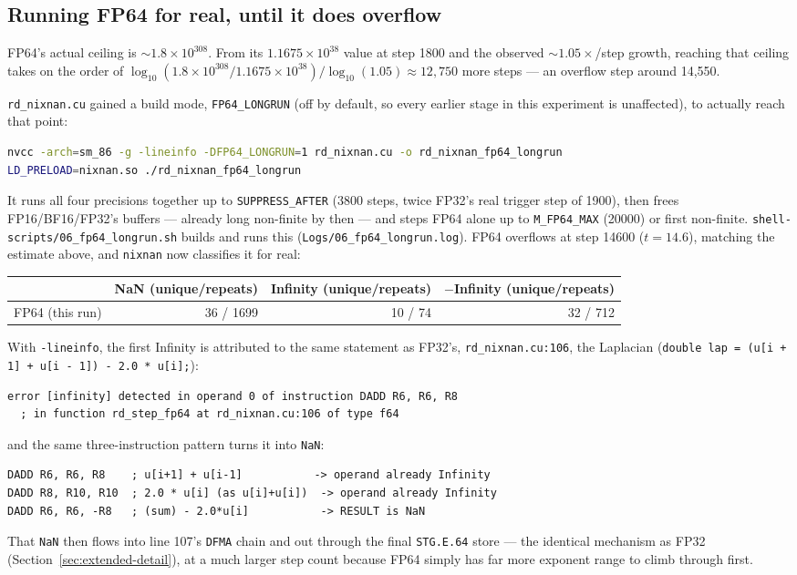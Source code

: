 \documentclass[11pt]{article}
\begin{document}
\subsection{Running FP64 for real, until it does overflow}
\label{sec:fp64-real}

FP64's actual ceiling is $\sim\!1.8\times10^{308}$. From its $1.1675\times10^{38}$ value
at step 1800 and the observed ${\sim}1.05\times$/step growth, reaching that ceiling takes
on the order of $\log_{10}(1.8\times10^{308}/1.1675\times10^{38}) / \log_{10}(1.05)
\approx 12{,}750$ more steps --- an overflow step around 14{,}550.

\texttt{rd\_nixnan.cu} gained a build mode, \texttt{FP64\_LONGRUN} (off by default, so
every earlier stage in this experiment is unaffected), to actually reach that point:
\begin{lstlisting}[language=bash]
nvcc -arch=sm_86 -g -lineinfo -DFP64_LONGRUN=1 rd_nixnan.cu -o rd_nixnan_fp64_longrun
LD_PRELOAD=nixnan.so ./rd_nixnan_fp64_longrun
\end{lstlisting}
It runs all four precisions together up to \texttt{SUPPRESS\_AFTER} (3800 steps, twice
FP32's real trigger step of 1900), then frees FP16/BF16/FP32's buffers --- already long
non-finite by then --- and steps FP64 alone up to \texttt{M\_FP64\_MAX} (20000) or first
non-finite. \texttt{shell-scripts/06\_fp64\_longrun.sh} builds and runs this
(\texttt{Logs/06\_fp64\_longrun.log}). FP64 overflows at step 14600 ($t{=}14.6$), matching
the estimate above, and \texttt{nixnan} now classifies it for real:

\begin{center}
\begin{tabular}{lrrr}
\toprule
 & NaN (unique/repeats) & Infinity (unique/repeats) & $-$Infinity (unique/repeats) \\
\midrule
FP64 (this run) & 36 / 1699 & 10 / 74 & 32 / 712 \\
\bottomrule
\end{tabular}
\end{center}

With \texttt{-lineinfo}, the first Infinity is attributed to the same statement as
FP32's, \texttt{rd\_nixnan.cu:106}, the Laplacian
(\texttt{double lap = (u[i + 1] + u[i - 1]) - 2.0 * u[i];}):
\begin{lstlisting}
error [infinity] detected in operand 0 of instruction DADD R6, R6, R8
  ; in function rd_step_fp64 at rd_nixnan.cu:106 of type f64
\end{lstlisting}
and the same three-instruction pattern turns it into \texttt{NaN}:
\begin{lstlisting}
DADD R6, R6, R8    ; u[i+1] + u[i-1]           -> operand already Infinity
DADD R8, R10, R10  ; 2.0 * u[i] (as u[i]+u[i])  -> operand already Infinity
DADD R6, R6, -R8   ; (sum) - 2.0*u[i]           -> RESULT is NaN
\end{lstlisting}
That \texttt{NaN} then flows into line 107's \texttt{DFMA} chain and out through the final
\texttt{STG.E.64} store --- the identical mechanism as FP32 (Section~\ref{sec:extended-detail}),
at a much larger step count because FP64 simply has far more exponent range to climb
through first.
\end{document}
